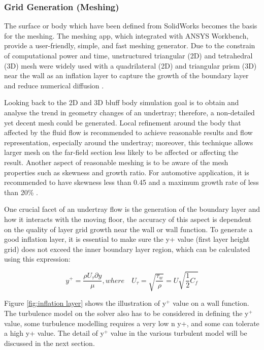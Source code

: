 \subsubsection{Grid Generation (Meshing)}
\noindent The surface or body which have been defined from SolidWorks becomes the basis for the meshing. The meshing app, which integrated with ANSYS Workbench, provide a user-friendly, simple, and fast meshing generator. Due to the constrain of computational power and time, unstructured triangular (2D) and tetrahedral (3D) mesh were widely used with a quadrilateral (2D) and triangular prism (3D) near the wall as an inflation layer to capture the growth of the boundary layer and reduce numerical diffusion \cite{Lanfrit2005BestFLUENT}.

\noindent Looking back to the 2D and 3D bluff body simulation goal is to obtain and analyse the trend in geometry changes of an undertray; therefore, a non-detailed yet decent mesh could be generated. Local refinement around the body that affected by the fluid flow is recommended \cite{Lanfrit2005BestFLUENT} to achieve reasonable results and flow representation, especially around the undertray; moreover, this technique allows larger mesh on the far-field section less likely to be affected or affecting the result. Another aspect of reasonable meshing is to be aware of the mesh properties such as skewness and growth ratio. For automotive application, it is recommended to have skewness less than 0.45 and a maximum growth rate of less than 20\% \cite{Lanfrit2005BestFLUENT}. 

\noindent One crucial facet of an undertray flow is the generation of the boundary layer and how it interacts with the moving floor, the accuracy of this aspect is dependent on the quality of layer grid growth near the wall or wall function. To generate a good inflation layer, it is essential to make sure the y+ value (first layer height grid) does not exceed the inner boundary layer region, which can be calculated using this expression:

\begin{equation}
    y^+ = \frac{\rho U_\tau \partial y}{\mu}, where \quad U_\tau = \sqrt{\frac{\tau_w}{\rho}} = U \sqrt{\frac{1}{2}C_f}
\end{equation}

\noindent Figure \ref{fig:inflation layer} shows the illustration of y$^+$  value on a wall function. The turbulence model on the solver also has to be considered in defining the y$^+$  value, some turbulence modelling requires a very low n y+, and some can tolerate a high y+ value. The detail of y$^+$ value in the various turbulent model will be discussed in the next section. 

